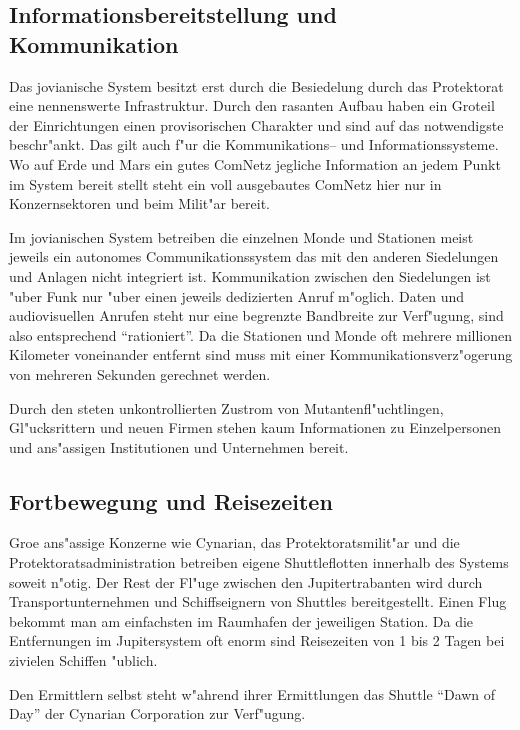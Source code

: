 \subsection{Informationsbereitstellung und Kommunikation}

Das jovianische System besitzt erst durch die Besiedelung durch das Protektorat eine nennenswerte Infrastruktur. Durch den rasanten Aufbau haben ein Gro\3teil der Einrichtungen einen provisorischen Charakter und sind auf das notwendigste beschr"ankt. Das gilt auch f"ur die Kommunikations-- und Informationssysteme. Wo auf Erde und Mars ein gutes ComNetz jegliche Information an jedem Punkt im System bereit stellt steht ein voll ausgebautes ComNetz hier nur in Konzernsektoren und beim Milit"ar bereit.

Im jovianischen System  betreiben die einzelnen Monde und Stationen meist jeweils ein autonomes Communikationssystem das mit den anderen Siedelungen und Anlagen nicht integriert ist. Kommunikation zwischen den Siedelungen ist "uber Funk nur "uber einen jeweils dedizierten Anruf m"oglich. Daten und audiovisuellen Anrufen steht nur eine begrenzte Bandbreite zur Verf"ugung, sind also entsprechend ``rationiert''. Da die Stationen und Monde oft mehrere millionen Kilometer voneinander entfernt sind muss mit einer Kommunikationsverz"ogerung von mehreren Sekunden gerechnet werden.

Durch den steten unkontrollierten Zustrom von Mutantenfl"uchtlingen, Gl"ucksrittern und neuen Firmen stehen kaum Informationen zu Einzelpersonen und ans"assigen Institutionen und Unternehmen bereit.

\subsection{Fortbewegung und Reisezeiten}

Gro\3e ans"assige Konzerne wie Cynarian, das Protektoratsmilit"ar und die Protektoratsadministration betreiben eigene Shuttleflotten innerhalb des Systems soweit n"otig. Der Rest der Fl"uge zwischen den Jupitertrabanten wird durch Transportunternehmen und Schiffseignern von Shuttles bereitgestellt. Einen Flug bekommt man am einfachsten im Raumhafen der jeweiligen Station. Da die Entfernungen im Jupitersystem oft enorm sind Reisezeiten von 1 bis 2 Tagen bei zivielen Schiffen "ublich.

Den Ermittlern selbst steht w"ahrend ihrer Ermittlungen das Shuttle ``Dawn of Day'' der Cynarian Corporation zur Verf"ugung.

